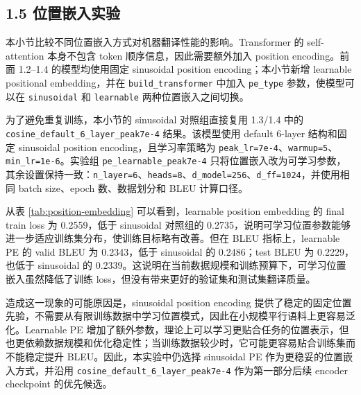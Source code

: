 ﻿\documentclass[UTF8,a4paper,12pt]{ctexart}
\begin{document}
\subsection{1.5 位置嵌入实验}

本小节比较不同位置嵌入方式对机器翻译性能的影响。Transformer 的 self-attention 本身不包含 token 顺序信息，因此需要额外加入 position encoding。前面 1.2--1.4 的模型均使用固定 sinusoidal position encoding；本小节新增 learnable positional embedding，并在 \texttt{build\_transformer} 中加入 \texttt{pe\_type} 参数，使模型可以在 \texttt{sinusoidal} 和 \texttt{learnable} 两种位置嵌入之间切换。

为了避免重复训练，本小节的 sinusoidal 对照组直接复用 1.3/1.4 中的 \texttt{cosine\_default\_6\_layer\_peak7e-4} 结果。该模型使用 default 6-layer 结构和固定 sinusoidal position encoding，且学习率策略为 \texttt{peak\_lr=7e-4}、\texttt{warmup=5}、\texttt{min\_lr=1e-6}。实验组 \texttt{pe\_learnable\_peak7e-4} 只将位置嵌入改为可学习参数，其余设置保持一致：\texttt{n\_layer=6}、\texttt{heads=8}、\texttt{d\_model=256}、\texttt{d\_ff=1024}，并使用相同 batch size、epoch 数、数据划分和 BLEU 计算口径。

\begin{table}[H]
\centering
\caption{位置嵌入方式实验结果}
\label{tab:position-embedding}
\end{table}

从表 \ref{tab:position-embedding} 可以看到，learnable position embedding 的 final train loss 为 0.2559，低于 sinusoidal 对照组的 0.2735，说明可学习位置参数能够进一步适应训练集分布，使训练目标略有改善。但在 BLEU 指标上，learnable PE 的 valid BLEU 为 0.2343，低于 sinusoidal 的 0.2486；test BLEU 为 0.2229，也低于 sinusoidal 的 0.2339。这说明在当前数据规模和训练预算下，可学习位置嵌入虽然降低了训练 loss，但没有带来更好的验证集和测试集翻译质量。

造成这一现象的可能原因是，sinusoidal position encoding 提供了稳定的固定位置先验，不需要从有限训练数据中学习位置模式，因此在小规模平行语料上更容易泛化。Learnable PE 增加了额外参数，理论上可以学习更贴合任务的位置表示，但也更依赖数据规模和优化稳定性；当训练数据较少时，它可能更容易贴合训练集而不能稳定提升 BLEU。因此，本实验中仍选择 sinusoidal PE 作为更稳妥的位置嵌入方式，并沿用 \texttt{cosine\_default\_6\_layer\_peak7e-4} 作为第一部分后续 encoder checkpoint 的优先候选。
\end{document}
